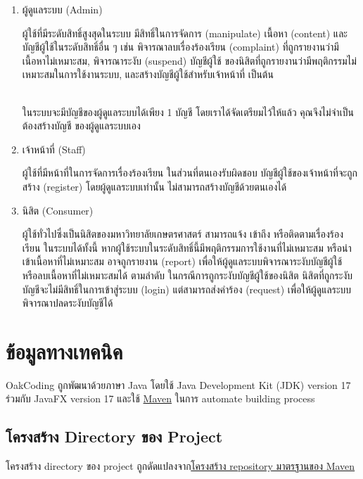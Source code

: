 \documentclass[../docs.tex]{subfiles}
\begin{document}
\begin{enumerate}
    \item ผู้ดูแลระบบ (Admin)

        ผู้ใช้ที่มีระดับสิทธิ์สูงสุดในระบบ มีสิทธิ์ในการจัดการ (manipulate) เนื้อหา (content)
        และบัญชีผู้ใช้ในระดับสิทธิ์อื่น ๆ เช่น พิจารณาลบเรื่องร้องเรียน (complaint) ที่ถูกรายงานว่ามีเนื้อหาไม่เหมาะสม, พิจารณาระงับ (suspend) บัญชีผู้ใช้
        ของนิสิตที่ถูกรายงานว่ามีพฤติกรรมไม่เหมาะสมในการใช้งานระบบ, และสร้างบัญชีผู้ใช้สำหรับเจ้าหน้าที่ เป็นต้น\\
        \rule{0em}{1ex}\\
        ในระบบจะมีบัญชีของผู้ดูแลระบบได้เพียง 1 บัญชี โดยเราได้จัดเตรียมไว้ให้แล้ว คุณจึงไม่จำเป็นต้องสร้างบัญชี
        ของผู้ดูแลระบบเอง
    \item เจ้าหน้าที่ (Staff)

        ผู้ใช้ที่มีหน้าที่ในการจัดการเรื่องร้องเรียน ในส่วนที่ตนเองรับผิดชอบ บัญชีผู้ใช้ของเจ้าหน้าที่จะถูกสร้าง
        (register) โดยผู้ดูแลระบบเท่านั้น ไม่สามารถสร้างบัญชีด้วยตนเองได้
    \item นิสิต (Consumer)

        ผู้ใช้ทั่วไปซึ่งเป็นนิสิตของมหาวิทยาลัยเกษตรศาสตร์ สามารถแจ้ง เข้าถึง หรือติดตามเรื่องร้องเรียน
        ในระบบได้ทั้งนี้ หากผู้ใช้ระบบในระดับสิทธิ์นี้มีพฤติกรรมการใช้งานที่ไม่เหมาะสม หรือนำเข้าเนื้อหาที่ไม่เหมาะสม
        อาจถูกรายงาน (report) เพื่อให้ผู้ดูแลระบบพิจารณาระงับบัญชีผู้ใช้ หรือลบเนื้อหาที่ไม่เหมาะสมได้ ตามลำดับ
        ในกรณีการถูกระงับบัญชีผู้ใช้ของนิสิต นิสิตที่ถูกระงับบัญชีจะไม่มีสิทธิ์ในการเข้าสู่ระบบ (login)
        แต่สามารถส่งคำร้อง (request) เพื่อให้ผู้ดูแลระบบพิจารณาปลดระงับบัญชีได้
\end{enumerate}

\clearpage

\section*{ข้อมูลทางเทคนิค}

OakCoding ถูกพัฒนาด้วยภาษา Java โดยใช้ Java Development Kit (JDK) version 17 ร่วมกับ JavaFX version 17
และใช้ \href{https://maven.apache.org/}{Maven} ในการ automate building process

\rule{0em}{1ex}
\subsection*{โครงสร้าง Directory ของ Project}

โครงสร้าง directory ของ project ถูกดัดแปลงจาก\href{https://maven.apache.org/guides/introduction/introduction-to-the-standard-directory-layout.html}{โครงสร้าง repository มาตรฐานของ Maven}
\end{document}
